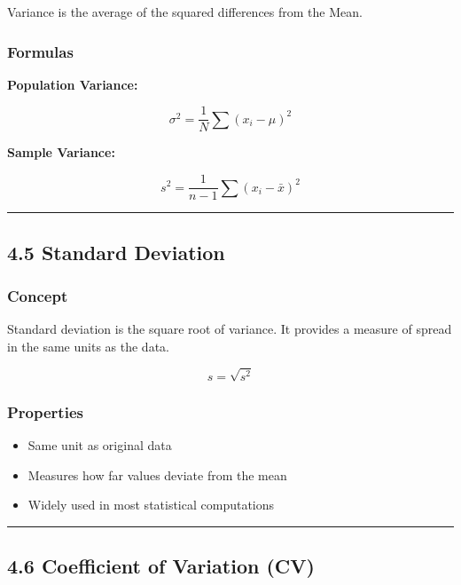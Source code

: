 \documentclass[
  letterpaper,
  DIV=11,
  numbers=noendperiod]{scrreprt}
\providecommand{\tightlist}{%
  \setlength{\itemsep}{0pt}\setlength{\parskip}{0pt}}
\begin{document}
Variance is the average of the squared differences from the Mean.

\subsubsection{Formulas}\label{formulas}

\textbf{Population Variance:}

\[
\sigma^2 = \frac{1}{N} \sum (x_i - \mu)^2
\]

\textbf{Sample Variance:}

\[
s^2 = \frac{1}{n-1} \sum (x_i - \bar{x})^2
\]

\begin{center}\rule{0.5\linewidth}{0.5pt}\end{center}

\subsection{4.5 Standard Deviation}\label{standard-deviation}

\subsubsection{Concept}\label{concept-1}

Standard deviation is the square root of variance. It provides a measure
of spread in the same units as the data.

\[
s = \sqrt{s^2}
\]

\subsubsection{Properties}\label{properties-1}

\begin{itemize}
\tightlist
\item
  Same unit as original data
\item
  Measures how far values deviate from the mean
\item
  Widely used in most statistical computations
\end{itemize}

\begin{center}\rule{0.5\linewidth}{0.5pt}\end{center}

\subsection{4.6 Coefficient of Variation
(CV)}\label{coefficient-of-variation-cv}
\end{document}
